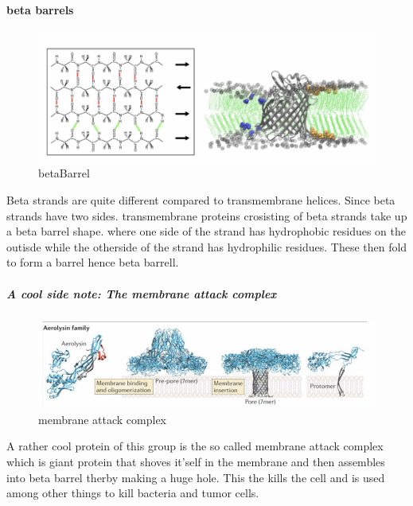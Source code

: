 \documentclass[../main.tex]{subfiles}
\begin{document}
\paragraph{beta barrels}

\begin{figure}[H]
    \centering
    \includegraphics[width=0.5\linewidth]{BBarrel.png}
    \caption{\gls{betaBarrel}}
    \label{fig:enter-label}
\end{figure}
Beta strands are quite different compared to transmembrane helices. Since beta strands have two sides. transmembrane proteins crosisting of beta strands take up a beta barrel shape. where one side of the strand has hydrophobic residues on the outisde while the otherside of the strand has hydrophilic residues. These then fold to form a barrel hence beta barrell.

\subparagraph{A cool side note: The membrane attack complex}

\begin{figure}[H]
    \centering
    \includegraphics[width=0.5\linewidth]{MAC.png}
    \caption{membrane attack complex}
    \label{fig:enter-label}
\end{figure}

A rather cool protein of this group is the so called membrane attack complex which is giant protein that shoves it'self in the membrane and then assembles into beta barrel therby making a huge hole. This the kills the cell and is used among other things to kill bacteria and tumor cells.
\end{document}
